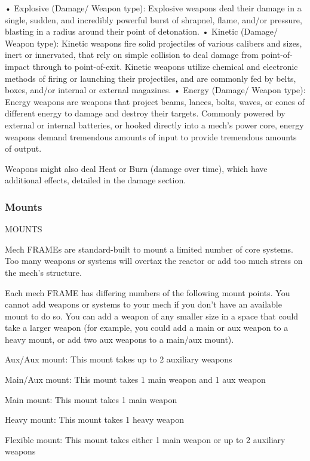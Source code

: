 •  Explosive (Damage/ Weapon type): Explosive weapons deal their damage in a single,
  sudden, and incredibly powerful burst of shrapnel, flame, and/or pressure, blasting in a radius
  around their point of detonation.
•  Kinetic (Damage/ Weapon type): Kinetic weapons fire solid projectiles of various calibers and
  sizes, inert or innervated, that rely on simple collision to deal damage from point-of-impact
  through to point-of-exit. Kinetic weapons utilize chemical and electronic methods of firing or
  launching their projectiles, and are commonly fed by belts, boxes, and/or internal or external
  magazines.
•  Energy (Damage/ Weapon type): Energy weapons are weapons that project beams, lances,
  bolts, waves, or cones of different energy to damage and destroy their targets. Commonly
  powered by external or internal batteries, or hooked directly into a mech’s power core, energy
  weapons demand tremendous amounts of input to provide tremendous amounts of output.


Weapons might also deal Heat or Burn (damage over time), which have additional effects,
detailed in the damage section.
\subsubsection{Mounts}
                                                 MOUNTS

Mech FRAMEs are standard-built to mount a limited number of core systems. Too many
weapons or systems will overtax the reactor or add too much stress on the mech’s structure.


Each mech FRAME has differing numbers of the following mount points. You cannot add
weapons or systems to your mech if you don’t have an available mount to do so. You can add a
weapon of any smaller size in a space that could take a larger weapon (for example, you could
add a main or aux weapon to a heavy mount, or add two aux weapons to a main/aux mount).


Aux/Aux mount: This mount takes up to 2 auxiliary weapons

Main/Aux mount: This mount takes 1 main weapon and 1 aux weapon

Main mount: This mount takes 1 main weapon

Heavy mount:  This mount takes 1 heavy weapon





Flexible mount: This mount takes either 1 main weapon or up to 2 auxiliary weapons


